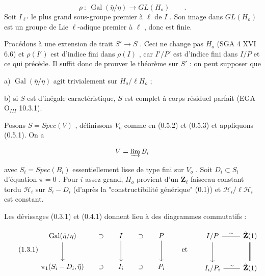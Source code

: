 \begin{equation*}
\rho \ : \ \operatorname{Gal}(\bar\eta/\eta) \longrightarrow GL(H_o) \qquad .
\end{equation*}
Soit  $I_{\ell'}$  le plus grand sous-groupe premier à  $\ell$ de  $I$ . Son image dans  $GL(H_o)$  est un groupe de Lie $\ell$-adique premier à  $\ell$ , donc est finie.

Procédons à une extension de trait  $S' \longrightarrow S$ . Ceci ne change pas  $H_o$ (SGA 4 XVI 6.6)  et  $\rho(I')$  est d'indice fini dans  $\rho(I)$ , car  $I'/P'$  est d'indice fini dans  $I/P$  et ce qui précède. Il suffit donc de prouver le théorème sur  $S'$ : on peut supposer que

a) $\operatorname{Gal}(\bar\eta/\eta)$  agit trivialement sur  $H_o/\ell H_o$  ;

b) si  $S$  est d'inégale caractéristique,  $S$  est complet à corps résiduel parfait (EGA $\mathrm{O}_{III}$  10.3.1).

Posons  $S = Spec(V)$ , définissons  $V_o$  comme en (0.5.2) et (0.5.3) et appliquons (0.5.1). On a

\begin{equation*}
V = \varinjlim B_i
\end{equation*}


avec  $S_i = Spec(B_i)$  essentiellement lisse de type fini sur  $V_o$ . Soit  $D_i \subset S_i$  d'équation  $\pi = 0$ . Pour  $i$  assez grand, $H_o$  provient d'un  $\mathbf{Z}_\ell$-faisceau constant tordu  $\mathcal{H}_i$  sur  $S_i - D_i$  (d'après la "constructibilité générique" (0.1)) et  $\mathcal{H}_i/\ell\mathcal{H}_i$  est constant.

Les dévissages (0.3.1) et (0.4.1) donnent lieu à des diagrammes commutatifs :

\begin{equation}\tag{1.3.1}
\begin{tikzcd}[column sep=small, row sep=large]
\mathrm{Gal}(\bar{\eta}/\eta) \arrow[d] & \supset & I \arrow[d] & \supset & P \arrow[d] \\
\pi_1(S_i-D_i,\bar{\eta}) & \supset & I_i & \supset & P_i
\end{tikzcd}
\qquad\text{et}\qquad
\begin{tikzcd}[row sep=large]
I/P \arrow[r, dash, "\sim"] \arrow[d] & \hat{\mathbf{Z}}(1) \arrow[d, equal] \\
I_i/P_i \arrow[r, dash, "\sim"] & \hat{\mathbf{Z}}(1)
\end{tikzcd}
\end{equation}

